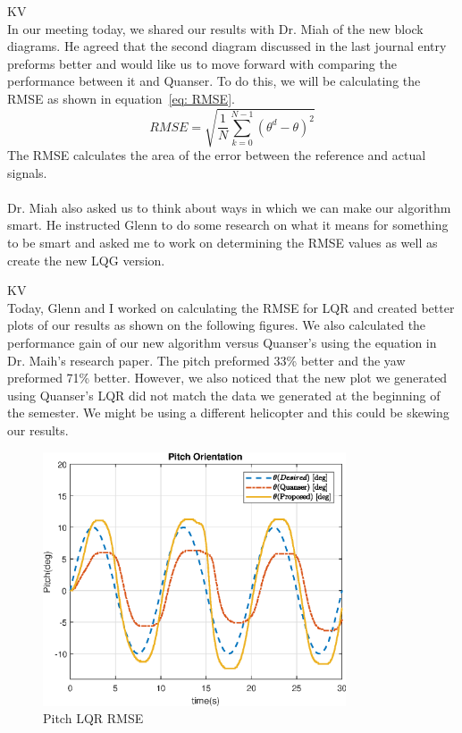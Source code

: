 \documentclass[fontsize=11pt, %
                             paper=letter, %
                             openany, %
                             captions=tableheading,
                             index=totoc,
                             hyperref]{labbook}
\begin{document}
\begin{addmargin}[0cm]{0cm}
KV\\
In our meeting today, we shared our results with Dr. Miah of the new block diagrams.  He agreed that the second diagram discussed in the last journal entry preforms better and would like us to move forward with comparing the performance between it and Quanser.  To do this, we will be calculating the RMSE as shown in equation~\ref{eq: RMSE}.
\begin{equation}
\label{eq: RMSE}
    RMSE = \sqrt{\frac{1}{N}\sum_{k=0}^{N-1}(\theta^d - \theta)^2 }
\end{equation}
The RMSE calculates the area of the error between the reference and actual signals.\\ \\
Dr. Miah also asked us to think about ways in which we can make our algorithm smart.  He instructed Glenn to do some research on what it means for something to be smart and asked me to work on determining the RMSE values as well as create the new LQG version.

KV\\
Today, Glenn and I worked on calculating the RMSE for LQR and created better plots of our results as shown on the following figures.  We also calculated the performance gain of our new algorithm versus Quanser's using the equation in Dr. Maih's research paper.  The pitch preformed 33\% better and the yaw preformed 71\% better.  However, we also noticed that the new plot we generated using Quanser's LQR did not match the data we generated at the beginning of the semester.  We might be using a different helicopter and this could be skewing our results.

\begin{figure}
  \centering
  \includegraphics[width=0.8\textwidth]{figs/img/02262019/Pitch_LQR_RMSE.eps}
  \caption{Pitch LQR RMSE}
  \label{fig:Pitch_LQR_RMSE}
\end{figure}


\end{addmargin}
\end{document}
